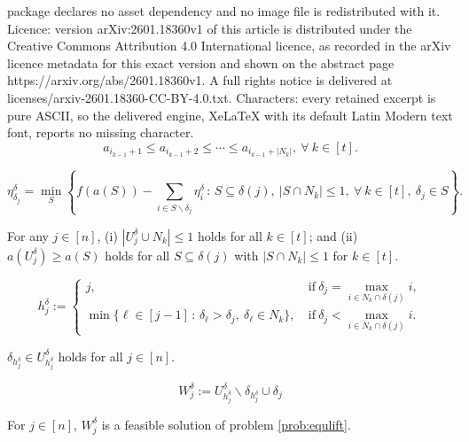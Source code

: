 \documentclass[10pt,a4paper]{amsart}
\newcommand{\D}{\delta}
\begin{document}
package declares no asset dependency and no image file is redistributed with it. Licence: version arXiv:2601.18360v1 of this article is distributed under the Creative Commons Attribution 4.0 International licence, as recorded in the arXiv licence metadata for this exact version and shown on the abstract page https://arxiv.org/abs/2601.18360v1. A full rights notice is delivered at licenses/arxiv-2601.18360-CC-BY-4.0.txt. Characters: every retained excerpt is pure ASCII, so the delivered engine, XeLaTeX with its default Latin Modern text font, reports no missing character.
\begin{equation}\label{asumption:a}
	a_{i_{k-1}+1}\leq a_{i_{k-1}+2}\leq\cdots\leq a_{i_{k-1}+|N_k|},~\forall~ k\in[t].
\end{equation}

\begin{equation}\label{prob:equlift}
	\eta^\D_{\D_j} = \min_S \left\{  f(a(S))-\sum_{i\in S \backslash\D_j}\eta^{\D}_i \,:\,
	S \subseteq \D(j), ~ |S \cap N_k |\leq 1, ~\forall~k\in[t], ~\D_j \in S
	 \right\}.
\end{equation}

\begin{Remark}\label{lem:propertyU}
	For any $j \in [n]$, (i) $|U_j^\delta \cup N_k|\leq 1$ holds for all $k \in [t]$; and 
	(ii) $a(U^{\D}_j)\geq a(S)$ holds for all $S \subseteq \D(j)$ with $|S \cap N_k |\leq 1$ for $k\in[t]$.
\end{Remark}

\begin{equation}\label{problem:defh}
	h^{\D}_j:=
	\begin{cases}
		j, & 
		~\text{if}~ \D_j= \max_{i\in N_k\cap \D(j)} i,\\
	    \min\{\ell\in [j-1]\,:\,\D_{\ell}>\D_j,
	    ~\D_{\ell}\in N_k\}, 
	    & ~\text{if}~ \D_j < \max_{i\in N_k \cap \D(j)} i.
	\end{cases}
\end{equation}

\begin{Lemma}\label{lem:propertyh}
	$\D_{h^\D_j}\in U^\D_{h^\D_j}$ holds for all $j\in[n]$.
\end{Lemma}

	\begin{equation}\label{def:W}
		W^\D_j:=U^\D_{ h^\D_j}\backslash \D_{h^\D_j}\cup \D_j
	\end{equation}

\begin{Lemma}\label{lem:feasibilityW}
	For $j\in[n]$, $W_j^\D$ is a feasible solution of  problem \eqref{prob:equlift}.
\end{Lemma}
\end{document}
